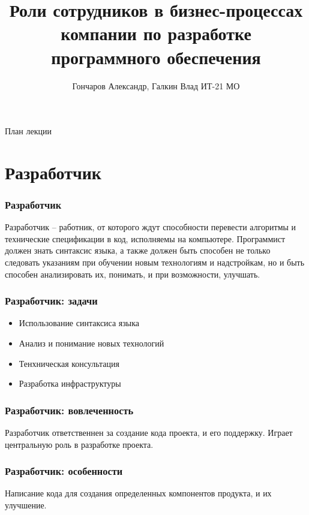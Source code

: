 \documentclass{../industrial-development}
\title{Роли сотрудников в бизнес-процессах компании по разработке программного обеспечения}
\author{Гончаров Александр, Галкин Влад ИТ-21 МО}
\date{}
\begin{document}
	
	\begin{frame}
		\titlepage
	\end{frame}
	
	\begin{frame}{План лекции}
		\tableofcontents
	\end{frame}
	
	
	\section{Разработчик }
	
	\begin{frame} \frametitle{Разработчик}
		\begin{block}{}
			\alert {}Разработчик – работник, от которого ждут способности перевести алгоритмы и технические спецификации в код, исполняемы на компьютере. Программист должен знать синтаксис языка, а также должен быть способен не только следовать указаниям при обучении новым технологиям и надстройкам, но и быть способен анализировать их, понимать, и при возможности, улучшать.
			
		\end{block}
		
	\end{frame}
	
	\begin{frame} \frametitle{Разработчик: задачи}
		\begin{itemize}
			\item Использование синтаксиса языка
			\item Анализ и понимание новых технологий
			\item Тенхническая консультация
			\item Разработка инфраструктуры
		\end{itemize}
	\end{frame}
	
	\begin{frame} \frametitle{Разработчик: вовлеченность}
		Разработчик ответственнен за создание кода проекта, и его поддержку. Играет центральную роль в разработке проекта.
	\end{frame}
	
	\begin{frame} \frametitle{Разработчик: особенности}
		Написание кода для создания определенных компонентов продукта, и их улучшение. 	
	\end{frame}
\end{document}
